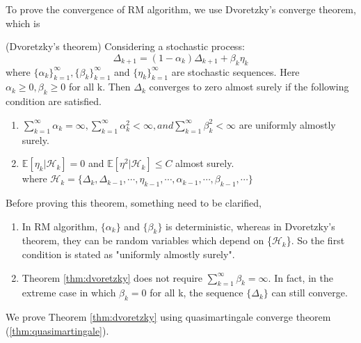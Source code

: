   To prove the convergence of RM algorithm, we use Dvoretzky's converge theorem, which is
  \begin{theorem}{(Dvoretzky's theorem)}
    \label{thm:dvoretzky}
    Considering a stochastic process:
    \begin{equation*}
      \Delta_{k+1} = \left(1-\alpha_k\right)\Delta_{k+1}+\beta_k\eta_k
    \end{equation*}
    where \( \{\alpha_k \}_{k=1}^{\infty}, \{\beta_k\}_{k=1}^{\infty} \) and \( \{\eta_k\}_{k=1}^{\infty} \) are
    stochastic sequences. Here \( \alpha_k \ge 0, \beta_k \ge 0 \) for all k. Then \( \Delta_k \) converges to zero almost
    surely if the following condition are satisfied.
    \begin{enumerate}[label=\alph*)]
      \item
            \( \sum_{k=1}^{\infty} \alpha_k =\infty, \sum_{k=1}^{\infty} \alpha_{k}^{2}< \infty, and \sum_{k=1}^{\infty}
            \beta_k^{2}<\infty\) are uniformly almostly surely.
      \item
            $\mathbb{E}[\eta_{k}|\mathcal{H}_{k}]=0$ and $\mathbb{E}[\eta^{2}|\mathcal{H}_{k}] \le C$ almost surely.\\ where
            $\mathcal{H}_{k}=\{\Delta_k,\Delta_{k-1},\cdots,\eta_{k-1},\cdots,\alpha_{k-1},\cdots,\beta_{k-1},\cdots\}$
    \end{enumerate}
  \end{theorem}
  Before proving this theorem, something need to be clarified,
  \begin{enumerate}

    \item
          In RM algorithm, $\{\alpha_{k}\}$ and $\{\beta_{k}\}$ is deterministic, whereas in Dvoretzky's theorem, they can be
          random variables which depend on \{$\mathcal{H}_{k}$\}. So the first condition is stated as "uniformly almostly
          surely". 
    \item
          Theorem \ref{thm:dvoretzky} does not require $\sum_{k=1}^{\infty} \beta_{k}=\infty$. In fact, in the extreme case in
          which $\beta_{k}=0$ for all k, the sequence $\{\Delta_{k}\}$ can still converge.

  \end{enumerate}
  We prove Theorem \ref{thm:dvoretzky} using quasimartingale converge theorem (\ref{thm:quasimartingale}).
